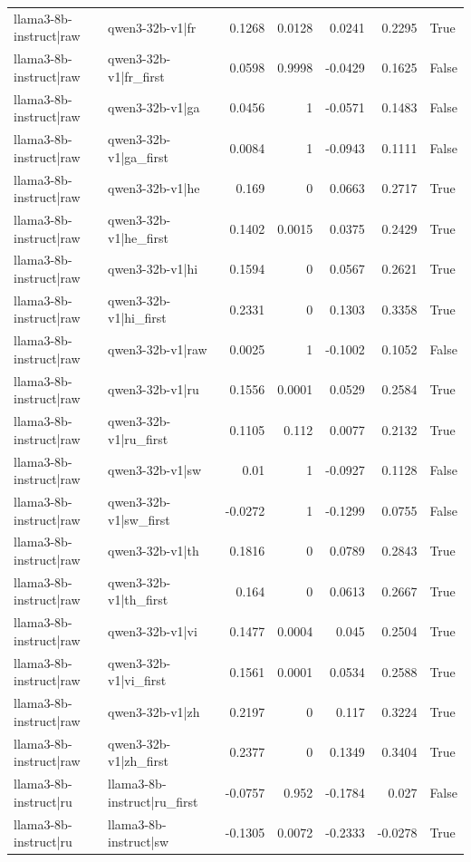 \begin{table}
\begin{tabular}{l l r r r r l}
llama3-8b-instruct|raw & qwen3-32b-v1|fr & 0.1268 & 0.0128 & 0.0241 & 0.2295 & True \\
llama3-8b-instruct|raw & qwen3-32b-v1|fr_first & 0.0598 & 0.9998 & -0.0429 & 0.1625 & False \\
llama3-8b-instruct|raw & qwen3-32b-v1|ga & 0.0456 & 1 & -0.0571 & 0.1483 & False \\
llama3-8b-instruct|raw & qwen3-32b-v1|ga_first & 0.0084 & 1 & -0.0943 & 0.1111 & False \\
llama3-8b-instruct|raw & qwen3-32b-v1|he & 0.169 & 0 & 0.0663 & 0.2717 & True \\
llama3-8b-instruct|raw & qwen3-32b-v1|he_first & 0.1402 & 0.0015 & 0.0375 & 0.2429 & True \\
llama3-8b-instruct|raw & qwen3-32b-v1|hi & 0.1594 & 0 & 0.0567 & 0.2621 & True \\
llama3-8b-instruct|raw & qwen3-32b-v1|hi_first & 0.2331 & 0 & 0.1303 & 0.3358 & True \\
llama3-8b-instruct|raw & qwen3-32b-v1|raw & 0.0025 & 1 & -0.1002 & 0.1052 & False \\
llama3-8b-instruct|raw & qwen3-32b-v1|ru & 0.1556 & 0.0001 & 0.0529 & 0.2584 & True \\
llama3-8b-instruct|raw & qwen3-32b-v1|ru_first & 0.1105 & 0.112 & 0.0077 & 0.2132 & True \\
llama3-8b-instruct|raw & qwen3-32b-v1|sw & 0.01 & 1 & -0.0927 & 0.1128 & False \\
llama3-8b-instruct|raw & qwen3-32b-v1|sw_first & -0.0272 & 1 & -0.1299 & 0.0755 & False \\
llama3-8b-instruct|raw & qwen3-32b-v1|th & 0.1816 & 0 & 0.0789 & 0.2843 & True \\
llama3-8b-instruct|raw & qwen3-32b-v1|th_first & 0.164 & 0 & 0.0613 & 0.2667 & True \\
llama3-8b-instruct|raw & qwen3-32b-v1|vi & 0.1477 & 0.0004 & 0.045 & 0.2504 & True \\
llama3-8b-instruct|raw & qwen3-32b-v1|vi_first & 0.1561 & 0.0001 & 0.0534 & 0.2588 & True \\
llama3-8b-instruct|raw & qwen3-32b-v1|zh & 0.2197 & 0 & 0.117 & 0.3224 & True \\
llama3-8b-instruct|raw & qwen3-32b-v1|zh_first & 0.2377 & 0 & 0.1349 & 0.3404 & True \\
llama3-8b-instruct|ru & llama3-8b-instruct|ru_first & -0.0757 & 0.952 & -0.1784 & 0.027 & False \\
llama3-8b-instruct|ru & llama3-8b-instruct|sw & -0.1305 & 0.0072 & -0.2333 & -0.0278 & True \\

\end{tabular}
\end{table}

